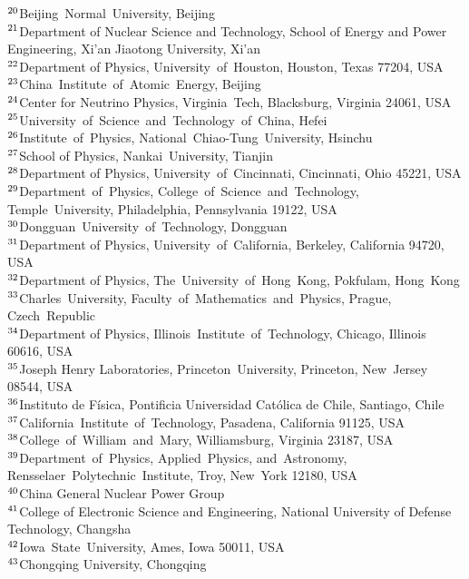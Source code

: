 {$^{20}$Beijing~Normal~University, Beijing \\ 
$^{21}$Department of Nuclear Science and Technology, School of Energy and Power Engineering, Xi'an Jiaotong University, Xi'an \\ 
$^{22}$Department of Physics, University~of~Houston, Houston, Texas  77204, USA \\ 
$^{23}$China~Institute~of~Atomic~Energy, Beijing \\ 
$^{24}$Center for Neutrino Physics, Virginia~Tech, Blacksburg, Virginia  24061, USA \\ 
$^{25}$University~of~Science~and~Technology~of~China, Hefei \\ 
$^{26}$Institute~of~Physics, National~Chiao-Tung~University, Hsinchu \\ 
$^{27}$School of Physics, Nankai~University, Tianjin \\ 
$^{28}$Department of Physics, University~of~Cincinnati, Cincinnati, Ohio 45221, USA \\ 
$^{29}$Department~of~Physics, College~of~Science~and~Technology, Temple~University, Philadelphia, Pennsylvania  19122, USA \\ 
$^{30}$Dongguan~University~of~Technology, Dongguan \\ 
$^{31}$Department of Physics, University~of~California, Berkeley, California  94720, USA \\ 
$^{32}$Department of Physics, The~University~of~Hong~Kong, Pokfulam, Hong~Kong \\ 
$^{33}$Charles~University, Faculty~of~Mathematics~and~Physics, Prague, Czech~Republic \\ 
$^{34}$Department of Physics, Illinois~Institute~of~Technology, Chicago, Illinois  60616, USA \\ 
$^{35}$Joseph Henry Laboratories, Princeton~University, Princeton, New~Jersey 08544, USA \\ 
$^{36}$Instituto de F\'isica, Pontificia Universidad Cat\'olica de Chile, Santiago, Chile \\ 
$^{37}$California~Institute~of~Technology, Pasadena, California 91125, USA \\ 
$^{38}$College~of~William~and~Mary, Williamsburg, Virginia  23187, USA \\ 
$^{39}$Department~of~Physics, Applied~Physics, and~Astronomy, Rensselaer~Polytechnic~Institute, Troy, New~York  12180, USA \\ 
$^{40}$China General Nuclear Power Group \\ 
$^{41}$College of Electronic Science and Engineering, National University of Defense Technology, Changsha \\ 
$^{42}$Iowa~State~University, Ames, Iowa  50011, USA \\ 
$^{43}$Chongqing University, Chongqing \\ 
} 
